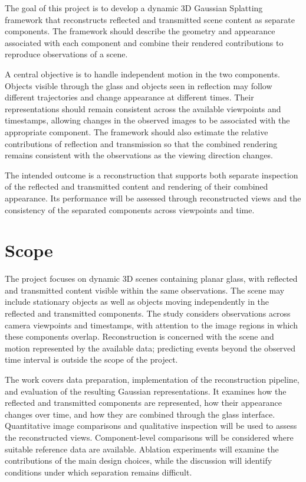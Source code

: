 The goal of this project is to develop a dynamic 3D Gaussian Splatting framework that reconstructs reflected and transmitted scene content as separate components. The framework should describe the geometry and appearance associated with each component and combine their rendered contributions to reproduce observations of a scene.

A central objective is to handle independent motion in the two components. Objects visible through the glass and objects seen in reflection may follow different trajectories and change appearance at different times. Their representations should remain consistent across the available viewpoints and timestamps, allowing changes in the observed images to be associated with the appropriate component. The framework should also estimate the relative contributions of reflection and transmission so that the combined rendering remains consistent with the observations as the viewing direction changes.

The intended outcome is a reconstruction that supports both separate inspection of the reflected and transmitted content and rendering of their combined appearance. Its performance will be assessed through reconstructed views and the consistency of the separated components across viewpoints and time.

\section{Scope}

The project focuses on dynamic 3D scenes containing planar glass, with reflected and transmitted content visible within the same observations. The scene may include stationary objects as well as objects moving independently in the reflected and transmitted components. The study considers observations across camera viewpoints and timestamps, with attention to the image regions in which these components overlap. Reconstruction is concerned with the scene and motion represented by the available data; predicting events beyond the observed time interval is outside the scope of the project.

The work covers data preparation, implementation of the reconstruction pipeline, and evaluation of the resulting Gaussian representations. It examines how the reflected and transmitted components are represented, how their appearance changes over time, and how they are combined through the glass interface. Quantitative image comparisons and qualitative inspection will be used to assess the reconstructed views. Component-level comparisons will be considered where suitable reference data are available. Ablation experiments will examine the contributions of the main design choices, while the discussion will identify conditions under which separation remains difficult.

